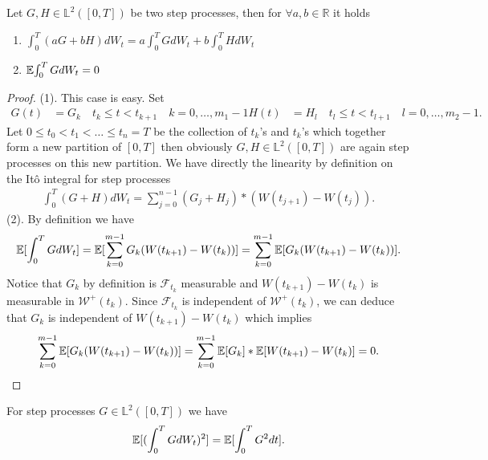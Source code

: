 \begin{prop}
  Let $G,H \in  \mathbb{L}^2([0,T])$  be two step processes, then for $\forall  a,b \in  \mathbb{R}$ it holds 
  \begin{enumerate}
    \item $\int_0^{T}(aG + bH)dW_t  = a \int_0^{T} G dW_t + b \int_0^{T} HdW_t  $
    \item $\mathbb{E}{\int_0^{T}GdW_t } = 0$
  \end{enumerate}
\end{prop}
\begin{proof}
  (1). This case is easy. Set 
  \begin{align*}
    G(t) &= G_k \quad t_k \le t <t_{k+1} \quad k=0,\ldots,m_1 -1
    H(t) &= H_l \quad t_l \le t <t_{l+1} \quad l=0,\ldots,m_2 -1
  .\end{align*}
  Let $0 \le  t_{0}<t_{1}<\ldots \le t_n=T$ be the collection of $t_k$'s and $t_k$'s which together form a new partition
  of $[0,T]$ then obviously $G,H \in  \mathbb{L}^2([0,T])$ are again step processes on this new partition. We have 
  directly the linearity by definition on the It\^o integral for step processes
  \begin{align*}
    \int_0^{T} (G+H)d W_t = \sum_{j=0}^{n-1} (G_j+H_j)*(W(t_{j+1})-W(t_j))
  .\end{align*}
  (2). By definition we have 
  \begin{align*}
    \mathbb{E}[\int_0^{T} GdW_t ] = \mathbb{E}[\sum_{k=0}^{m-1}G_k(W(t_{k+1})-W(t_k)) ] = \sum_{k=0}^{m-1} \mathbb{E}[G_k(W(t_{k+1})- W(t_k))] 
  .\end{align*}
  Notice that $G_k$ by definition is $\mathcal{F}_{t_k}$ measurable and $W(t_{k+1}) - W(t_k)$ is measurable in $\mathcal{W}^{+}(t_k) $. Since
  $\mathcal{F}_{t_k}$ is independent of $\mathcal{W}^{+}(t_k) $, we can deduce that $G_k$ is independent of $W(t_{k+1}) - W(t_k)$ which implies 
  \begin{align*}
    \sum_{k=0}^{m-1} \mathbb{E}[G_k(W(t_{k+1})- W(t_k))]  = \sum_{k=0}^{m-1} \mathbb{E}[G_k]*\mathbb{E}[W(t_{k+1}) - W(t_k)]  =0
  .\end{align*}
\end{proof}
\begin{lemma}
  For step processes $G \in  \mathbb{L}^2([0,T])$  we have 
  \begin{align*}
    \mathbb{E}[(\int_0^{T} G dW_t )^2] = \mathbb{E}[\int_0^{T} G^2 dt ]
  .\end{align*}
\end{lemma}
